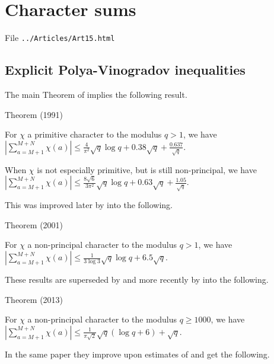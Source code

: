 \chapter{  Character sums}

File \texttt{../Articles/Art15.html}










\section{Explicit Polya-Vinogradov inequalities
}



The main Theorem of \cite{Qiu*91}
implies the following result.


\begin{thm}{Theorem (1991)}

  For $\chi$ a primitive character to the modulus $q > 1$, we have
$
\left|\sum\limits_{a=M+1}^{M+N}\chi(a)\right|
\le
\frac{4}{\pi^2}\sqrt{q}\log q+0.38\sqrt{q}+\frac{0.637}{\sqrt{q}}
$.

 When $\chi$ is not especially primitive, but is still non-principal, we
  have
$
\left|\sum\limits_{a=M+1}^{M+N}\chi(a)\right|
\le
\frac{8\sqrt{6}}{3\pi^2}\sqrt{q}\log q+0.63\sqrt{q}+\frac{1.05}{\sqrt{q}}
$.
\end{thm}

This was improved later by
\cite{Bachman-Rachakonda*01} into
the following.

\begin{thm}{Theorem (2001)}

  For $\chi$ a non-principal character to the modulus $q > 1$, we have
$
\left|\sum\limits_{a=M+1}^{M+N}\chi(a)\right|
\le
\frac{1}{3\log 3}\sqrt{q}\log q+6.5\sqrt{q}
$. 
\end{thm}


These results are superseded by
\cite{Frolenkov*11} and more
recently by
\cite{Frolenkov-Soundararajan*13} into
the following.

\begin{thm}{Theorem (2013)}

  For $\chi$ a non-principal character to the modulus $q\ge 1000$, we have
$
\left|\sum\limits_{a=M+1}^{M+N}\chi(a)\right|
\le
\frac{1}{\pi\sqrt{2}}\sqrt{q}(\log q+6)+\sqrt{q}
$. 
\end{thm}


In the same paper they improve upon estimates of
\cite{Pomerance*11} and get the following.

